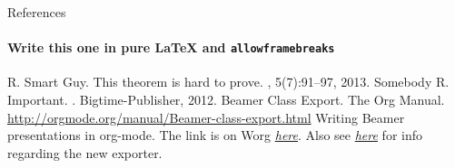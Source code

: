 \documentclass[presentation]{beamer}
\begin{document}
\begin{frame}[allowframebreaks,label=sec-1-4]{References}
\framesubtitle{Write this one in pure LaTeX and \texttt{allowframebreaks}}

\begin{thebibliography}{10}    
\beamertemplatearticlebibitems
{}
  R. Smart Guy.
  \newblock This theorem is hard to prove.
  , 5(7):91--97, 2013.
\beamertemplatebookbibitems
{}
  Somebody R. Important.
  .
  \newblock Bigtime-Publisher, 2012.
\beamertemplatearrowbibitems
{}
  Beamer Class Export.
  \newblock The Org Manual.
  \newblock \url{http://orgmode.org/manual/Beamer-class-export.html}
  Writing Beamer presentations in org-mode.
  \newblock The link is on Worg \href{http://orgmode.org/worg/exporters/beamer/tutorial.html}{\emph{here}}. Also see \href{http://orgmode.org/worg/exporters/beamer/ox-beamer.html}{\emph{here}} for info regarding the new exporter.
\end{thebibliography}
\end{frame}
\end{document}

